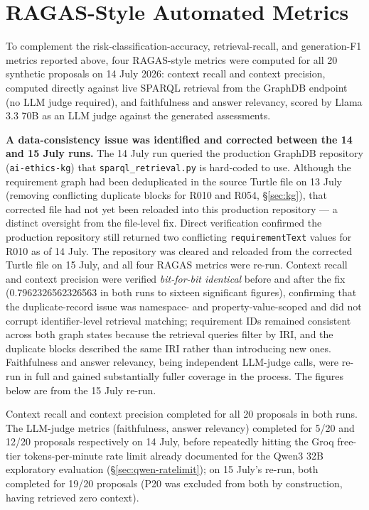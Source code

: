 \section{RAGAS-Style Automated Metrics}
\label{sec:ragas-validation}

To complement the risk-classification-accuracy, retrieval-recall, and generation-F1 metrics reported above, four RAGAS-style metrics \cite{gao2023rag} were computed for all 20 synthetic proposals on 14 July 2026: context recall and context precision, computed directly against live SPARQL retrieval from the GraphDB endpoint (no LLM judge required), and faithfulness and answer relevancy, scored by Llama 3.3 70B as an LLM judge against the generated assessments.

\textbf{A data-consistency issue was identified and corrected between the 14 and 15 July runs.} The 14 July run queried the production GraphDB repository (\texttt{ai-ethics-kg}) that \texttt{sparql\_retrieval.py} is hard-coded to use. Although the requirement graph had been deduplicated in the source Turtle file on 13 July (removing conflicting duplicate blocks for R010 and R054, \S\ref{sec:kg}), that corrected file had not yet been reloaded into this production repository — a distinct oversight from the file-level fix. Direct verification confirmed the production repository still returned two conflicting \texttt{requirementText} values for R010 as of 14 July. The repository was cleared and reloaded from the corrected Turtle file on 15 July, and all four RAGAS metrics were re-run. Context recall and context precision were verified \emph{bit-for-bit identical} before and after the fix (0.7962326562326563 in both runs to sixteen significant figures), confirming that the duplicate-record issue was namespace- and property-value-scoped and did not corrupt identifier-level retrieval matching; requirement IDs remained consistent across both graph states because the retrieval queries filter by IRI, and the duplicate blocks described the same IRI rather than introducing new ones. Faithfulness and answer relevancy, being independent LLM-judge calls, were re-run in full and gained substantially fuller coverage in the process. The figures below are from the 15 July re-run.

Context recall and context precision completed for all 20 proposals in both runs. The LLM-judge metrics (faithfulness, answer relevancy) completed for 5/20 and 12/20 proposals respectively on 14 July, before repeatedly hitting the Groq free-tier tokens-per-minute rate limit already documented for the Qwen3 32B exploratory evaluation (\S\ref{sec:qwen-ratelimit}); on 15 July's re-run, both completed for 19/20 proposals (P20 was excluded from both by construction, having retrieved zero context).

